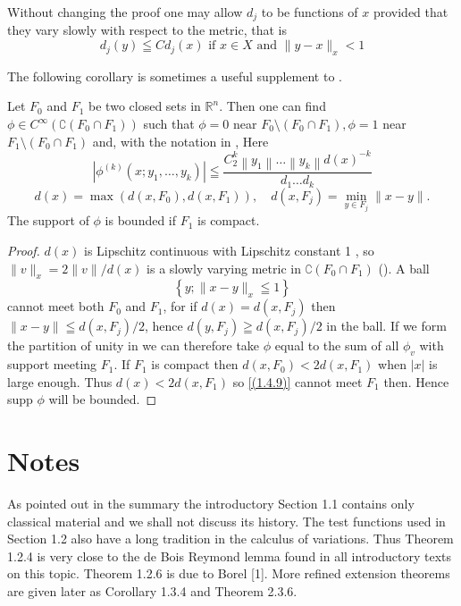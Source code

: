 \begin{remark}
    Without changing the proof one may allow $d_{j}$ to be functions of $x$ provided that they vary slowly with respect to the metric, that is
    \begin{equation}
        \label{(1.4.5)'} 
        d_{j}(y) \leqq C d_{j}(x) \text{ if } x \in X \text{ and } \|y-x\|_{x}<1
    \end{equation}
\end{remark}
The following corollary is sometimes a useful supplement to .
\begin{cor}
    Let $F_{0}$ and $F_{1}$ be two closed sets in $\mathbb{R}^{n}$. Then one can find $\phi \in C^{\infty}\left(\complement\left(F_{0} \cap F_{1}\right)\right)$ such that $\phi=0$ near $F_{0} \setminus\left(F_{0} \cap F_{1}\right), \phi=1$ near $F_{1} \setminus\left(F_{0} \cap F_{1}\right)$ and, with the notation in ,
Here
\begin{equation}
    \label{(1.4.8)}
	\left|\phi^{(k)}\left(x ; y_{1}, \ldots, y_{k}\right)\right| \leqq \frac{C_{2}^{k}\left\|y_{1}\right\| \ldots\left\|y_{k}\right\| d(x)^{-k}}{d_{1} \ldots d_{k}} 
\end{equation}
\[
	d(x)=\max \left(d\left(x, F_{0}\right), d\left(x, F_{1}\right)\right), \quad d\left(x, F_{j}\right)=\min _{y \in F_{j}}\|x-y\| .
\]
The support of $\phi$ is bounded if $F_{1}$ is compact.
\end{cor}
\begin{proof}
    $d(x)$ is Lipschitz continuous with Lipschitz constant 1 , so $\|v\|_{x}=2\|v\| / d(x)$ is a slowly varying metric in $\complement\left(F_{0} \cap F_{1}\right)$ (). A ball
\begin{equation}
    \label{(1.4.9)}
	\left\{y ;\|x-y\|_{x} \leqq 1\right\} 
\end{equation}
cannot meet both $F_{0}$ and $F_{1}$, for if $d(x)=d\left(x, F_{j}\right)$ then $\|x-y\|\leqq d\left(x, F_{j}\right) / 2$, hence $d\left(y, F_{j}\right) \geqq d\left(x, F_{j}\right) / 2$ in the ball. If we form the partition of unity in  we can therefore take $\phi$ equal to the sum of all $\phi_{v}$ with support meeting $F_{1}$. If $F_{1}$ is compact then $d\left(x, F_{0}\right)<2 d\left(x, F_{1}\right)$ when $|x|$ is large enough. Thus $d(x)<2 d\left(x, F_{1}\right)$ so \eqref{(1.4.9)} cannot meet $F_{1}$ then. Hence supp $\phi$ will be bounded.
\end{proof}

\section{Notes}
As pointed out in the summary the introductory Section 1.1 contains only classical material and we shall not discuss its history. The test functions used in Section 1.2 also have a long tradition in the calculus of variations. Thus Theorem 1.2.4 is very close to the de Bois Reymond lemma found in all introductory texts on this topic. Theorem 1.2.6 is due to Borel [1]. More refined extension theorems are given later as Corollary 1.3.4 and Theorem 2.3.6.

